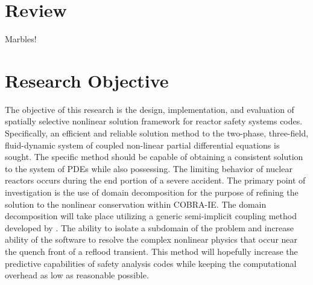 \section{Review}
\label{sect:review}
Marbles!
\section{Research Objective}
The objective of this research is the design, implementation, and evaluation of spatially selective nonlinear solution framework for reactor safety systems codes.
Specifically, an efficient and reliable solution method to the two-phase, three-field, fluid-dynamic system of coupled non-linear partial differential equations is sought.
The specific method should be capable of obtaining a consistent solution to the system of PDEs while also possessing.
\cite{Aktas1996}
The limiting behavior of nuclear reactors occurs during the end portion of a severe accident.
The primary point of investigation is the use of domain decomposition for the purpose of refining the solution to the nonlinear conservation within COBRA-IE.
The domain decomposition will take place utilizing a generic semi-implicit coupling method developed by \citet{Weaver2002}.
The ability to isolate a subdomain of the problem and increase ability of the software to resolve the complex nonlinear physics that occur near the quench front of a reflood transient.
This method will hopefully increase the predictive capabilities of safety analysis codes while keeping the computational overhead as low as reasonable possible.